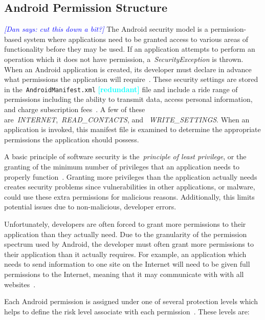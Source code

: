 \documentclass{sig-alternate}
\newcommand{\todo}[1]{\textcolor{cyan}{\textbf{[#1]}}}
\newcommand{\dan}[1]{\textcolor{blue}{{\it [Dan says: #1]}}}
\begin{document}
\subsection{Android Permission Structure}
\dan{cut this down a bit?}
The Android security model is a permission-based system where applications need to be granted access to various areas of functionality before they may be used. If an application attempts to perform an operation which it does not have permission, a~\emph{SecurityException} is thrown. When an Android application is created, its developer must declare in advance what permissions the application will require~\cite{Felt:2011:APD:2046707.2046779}. These security settings are stored in the~\texttt{AndroidManifest.xml} \todo{redundant} file and include a ride range of permissions including the ability to transmit data, access personal information, and charge subscription fees~\cite{Barrera:2010:MEA:1866307.1866317}. A few of these are~\emph{INTERNET},~\emph{READ\_CONTACTS}, and ~\emph{WRITE\_SETTINGS}. When an application is invoked, this manifest file is examined to determine the appropriate permissions the application should possess.

A basic principle of software security is the~\emph{principle of least privilege}, or the granting of the minimum number of privileges that an application needs to properly function~\cite{saltzer1975protection}. Granting more privileges than the application actually needs creates security problems since vulnerabilities in other applications, or malware, could use these extra permissions for malicious reasons. Additionally, this limits potential issues due to non-malicious, developer errors.

Unfortunately, developers are often forced to grant more permissions to their application than they actually need. Due to the granularity of the permission spectrum used by Android, the developer must often grant more permissions to their application than it actually requires. For example, an application which needs to send information to one site on the Internet will need to be given full permissions to the Internet, meaning that it may communicate with with all websites~\cite{jeon2011dr}.

Each Android permission is assigned under one of several protection levels which helps to define the risk level associate with each permission~\cite{permissionLevelsURL}. These levels are:
\end{document}
